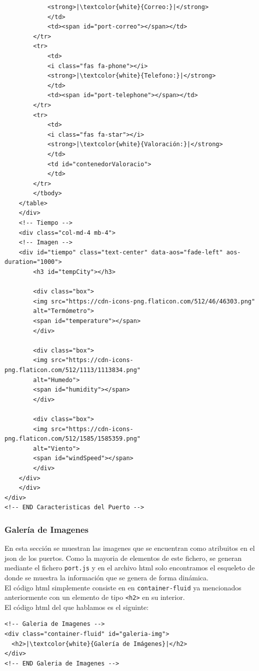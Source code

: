 \documentclass{article}
\begin{document}
\begin{verbatim}
            <strong>|\textcolor{white}{Correo:}|</strong>
            </td>
            <td><span id="port-correo"></span></td>
        </tr>
        <tr>
            <td>
            <i class="fas fa-phone"></i>
            <strong>|\textcolor{white}{Telefono:}|</strong>
            </td>
            <td><span id="port-telephone"></span></td>
        </tr>
        <tr>
            <td>
            <i class="fas fa-star"></i>
            <strong>|\textcolor{white}{Valoración:}|</strong>
            </td>
            <td id="contenedorValoracio">
            </td>
        </tr>
        </tbody>
    </table>
    </div>
    <!-- Tiempo -->
    <div class="col-md-4 mb-4">
    <!-- Imagen -->
    <div id="tiempo" class="text-center" data-aos="fade-left" aos-duration="1000">
        <h3 id="tempCity"></h3>
    
        <div class="box">
        <img src="https://cdn-icons-png.flaticon.com/512/46/46303.png" 
        alt="Termómetro">
        <span id="temperature"></span>
        </div>
    
        <div class="box">
        <img src="https://cdn-icons-png.flaticon.com/512/1113/1113834.png" 
        alt="Humedo">
        <span id="humidity"></span>
        </div>
    
        <div class="box">
        <img src="https://cdn-icons-png.flaticon.com/512/1585/1585359.png" 
        alt="Viento">
        <span id="windSpeed"></span>
        </div>
    </div>
    </div>
</div>
<!-- END Caracteristicas del Puerto -->
\end{verbatim}

\subsubsection{Galería de Imagenes}
En esta sección se muestran las imagenes que se encuentran como atribuitos en el json de los puertos. Como la mayoria de elementos de este fichero, se generan mediante el fichero \texttt{port.js} y en el archivo html solo encontramos el esqueleto de donde se muestra la información que se genera de forma dinámica.\\

\noindent El código html simplemente consiste en en \texttt{container-fluid} ya mencionados anteriormente con un elemento de tipo \texttt{<h2>} en su interior.\\

\noindent El código html del que hablamos es el siguinte:
\begin{verbatim}
<!-- Galeria de Imagenes -->
<div class="container-fluid" id="galeria-img">
  <h2>|\textcolor{white}{Galería de Imágenes}|</h2>
</div>
<!-- END Galeria de Imagenes -->
\end{verbatim}
\end{document}
